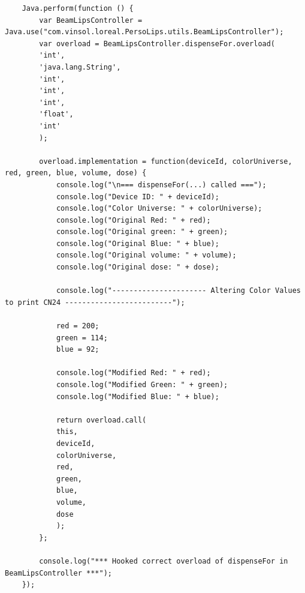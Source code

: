 \begin{verbatim}
	Java.perform(function () {
		var BeamLipsController = Java.use("com.vinsol.loreal.PersoLips.utils.BeamLipsController");
		var overload = BeamLipsController.dispenseFor.overload(
		'int',
		'java.lang.String',
		'int',
		'int',
		'int',
		'float',
		'int'
		);
		
		overload.implementation = function(deviceId, colorUniverse, red, green, blue, volume, dose) {
			console.log("\n=== dispenseFor(...) called ===");
			console.log("Device ID: " + deviceId);
			console.log("Color Universe: " + colorUniverse);
			console.log("Original Red: " + red);
			console.log("Original green: " + green);
			console.log("Original Blue: " + blue);
			console.log("Original volume: " + volume);
			console.log("Original dose: " + dose);
			
			console.log("---------------------- Altering Color Values to print CN24 -------------------------");
			
			red = 200;
			green = 114;
			blue = 92;
			
			console.log("Modified Red: " + red);
			console.log("Modified Green: " + green);
			console.log("Modified Blue: " + blue);
			
			return overload.call(
			this,
			deviceId,
			colorUniverse,
			red,
			green,
			blue,
			volume,
			dose
			);
		};
		
		console.log("*** Hooked correct overload of dispenseFor in BeamLipsController ***");
	});
\end{verbatim}

